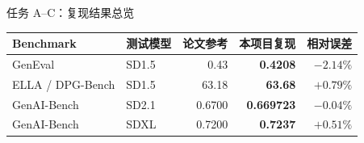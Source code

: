 \documentclass[aspectratio=169,10pt]{beamer}
\newcommand{\result}[1]{\textcolor{T2IBlue}{\bfseries #1}}
\newcommand{\diff}[1]{\textcolor{T2IRed}{\bfseries #1}}
\begin{document}
\begin{frame}{任务 A--C：复现结果总览}
  \vfill
  \begin{table}
    \centering
    \renewcommand{\arraystretch}{1.35}
    \setlength{\tabcolsep}{8pt}
    \begin{tabular}{llrrr}
      \toprule
      Benchmark & 测试模型 & 论文参考 & 本项目复现 & 相对误差 \\
      \midrule
      GenEval & SD1.5 & 0.43 & \result{0.4208} & \diff{$-2.14\%$} \\
      ELLA / DPG-Bench & SD1.5 & 63.18 & \result{63.68} & \diff{$+0.79\%$} \\
      GenAI-Bench & SD2.1 & 0.6700 & \result{0.669723} & \diff{$-0.04\%$} \\
      GenAI-Bench & SDXL & 0.7200 & \result{0.7237} & \diff{$+0.51\%$} \\
      \bottomrule
    \end{tabular}
  \end{table}
  \vfill
\end{frame}

\end{document}
